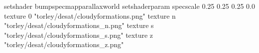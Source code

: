 setshader bumpspecmapparallaxworld
setshaderparam specscale 0.25 0.25 0.25 0.0
texture 0 "torley/desat/cloudyformations.png"
texture n "torley/desat/cloudyformations_n.png"
texture s "torley/desat/cloudyformations_s.png"
texture z "torley/desat/cloudyformations_z.png"

